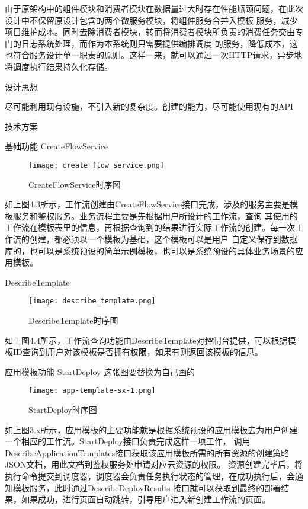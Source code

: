 由于原架构中的组件模块和消费者模块在数据量过大时存在性能瓶颈问题，在此次设计中不保留原设计包含的两个微服务模块，将组件服务合并入模板
服务，减少项目维护成本。同时去除消费者模块，转而将消费者模块所负责的消费任务交由专门的日志系统处理，而作为本系统则只需要提供编排调度
的服务，降低成本，这也符合服务设计单一职责的原则。这样一来，就可以通过一次HTTP请求，异步地将调度执行结果持久化存储。

设计思想

尽可能利用现有设施，不引入新的复杂度。创建的能力，尽可能使用现有的API

技术方案

基础功能
CreateFlowService

\begin{figure}[H]
    \centering
    \texttt{[image: create\_flow\_service.png]}
    \caption{CreateFlowService时序图}
    \label{fig:CreateFlowService时序图}
    \note{}
\end{figure}

如上图4.3所示，工作流创建由CreateFlowService接口完成，涉及的服务主要是模板服务和鉴权服务。业务流程主要是先根据用户所设计的工作流，查询
其使用的工作流在模板表里的信息，再根据查询到的结果进行实际工作流的创建。每一次工作流的创建，都必须以一个模板为基础，这个模板可以是用户
自定义保存到数据库的，也可以是系统预设的简单示例模板，也可以是系统预设的具体业务场景的应用模板。

DescribeTemplate

\begin{figure}[H]
    \centering
    \texttt{[image: describe\_template.png]}
    \caption{DescribeTemplate时序图}
    \label{fig:DescribeTemplate时序图}
    \note{}
\end{figure}

如上图4.4所示，工作流查询功能由DescribeTemplate对控制台提供，可以根据模板ID查询到用户对该模板是否拥有权限，如果有则返回该模板的信息。



应用模板功能
StartDeploy
这张图要替换为自己画的
\begin{figure}[h]
    \centering
    \texttt{[image: app-template-sx-1.png]}
    \caption{StartDeploy时序图}
    \label{fig:StartDeploy时序图}
\end{figure}
如上图3.x所示，应用模板的主要功能就是根据系统预设的应用模板去为用户创建一个相应的工作流。StartDeploy接口负责完成这样一项工作，
调用DescribeApplicationTemplates接口获取该应用模板所需的所有资源的创建策略JSON文档，用此文档到鉴权服务处申请对应云资源的权限。
资源创建完毕后，将执行命令提交到调度器，调度器会负责任务执行状态的管理，在成功执行后，会通知模板服务，此时通过DescribeDeployResults
接口就可以获取到最终的部署结果，如果成功，进行页面自动跳转，引导用户进入新创建工作流的页面。

